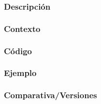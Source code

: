 \subsubsection{Descripci\'on} 
\subsubsection{Contexto} 
\subsubsection{C\'odigo} 

\subsubsection{Ejemplo} 
\subsubsection{Comparativa/Versiones} 